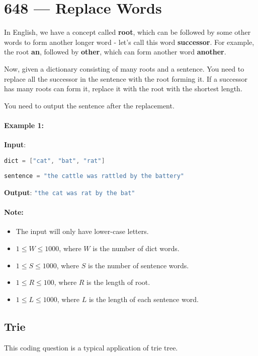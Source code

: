 \section{648 --- Replace Words}
In English, we have a concept called \textbf{root}, which can be followed by some other words to form another longer word - let's call this word \textbf{successor}. For example, the root \textbf{an}, followed by \textbf{other}, which can form another word \textbf{another}.

Now, given a dictionary consisting of many roots and a sentence. You need to replace all the successor in the sentence with the root forming it. If a successor has many roots can form it, replace it with the root with the shortest length.

You need to output the sentence after the replacement.

\paragraph{Example 1:}

\begin{flushleft}
\textbf{Input}: 

\lstinline[language=Java, basicstyle=\small\ttfamily, keywordstyle=\bfseries\color{green!40!black}]|dict = ["cat", "bat", "rat"]|

\lstinline[language=Java, basicstyle=\small\ttfamily, keywordstyle=\bfseries\color{green!40!black}]|sentence = "the cattle was rattled by the battery"|

\textbf{Output}: \lstinline[language=Java, basicstyle=\small\ttfamily, keywordstyle=\bfseries\color{green!40!black}]|"the cat was rat by the bat"|

\end{flushleft}
 

\paragraph{Note:}

\begin{itemize}
\item The input will only have lower-case letters.
\item $1 \leq W \leq 1000$, where $W$ is the number of dict words.
\item $1 \leq S \leq 1000$, where $S$ is the number of sentence words.
\item $1 \leq R \leq 100$, where $R$ is the length of root.
\item $1 \leq L \leq 1000$, where $L$ is the length of each sentence word.
\end{itemize}

\subsection{Trie}
This coding question is a typical application of trie tree.